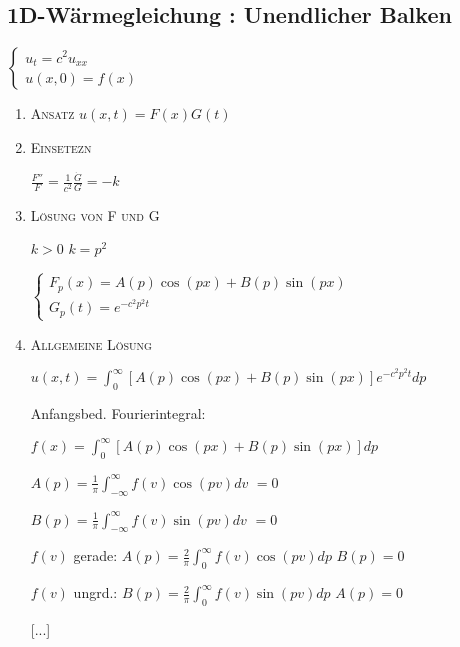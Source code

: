 \documentclass[10pt,a4paper]{scrartcl}
\begin{document}
\begin{multicols*}{3}
\begin{enumerate}
	\end{enumerate}
	
	\finn
	
	\subsection{1D-Wärmegleichung : Unendlicher Balken}
	
	\begin{center}
	$\begin{cases}
	u_t=c^2u_{xx}\\
	u(x,0)=f(x)
	\end{cases}$
	\end{center}
	
	\begin{enumerate}
	\item \scshape{Ansatz} $u(x,t) = F(x)G(t)$
	
	\item \scshape{Einsetezn}
	
	$\frac{F''}{F}=\frac{1}{c^2}\frac{\dot{G}}{G}=-k$
	
	\item \scshape{Lösung von F und G}
	
	$k>0$ \dahe $k = p^2$
	
	\begin{center}
	$\begin{cases}
	F_p(x)=A(p)\cos(px)+B(p)\sin(px)\\
	G_p(t)=e^{-c^2p^2t}
	\end{cases}$
	\end{center}
	
	\item \scshape{Allgemeine Lösung}
	
	$u(x,t)=\int_0^\infty{[A(p)\cos(px)+B(p)\sin(px)]e^{-c^2p^2t}dp}$
	
	Anfangsbed. \dahe Fourierintegral:
	
	\dahe $f(x)=\int_0^\infty{[A(p)\cos(px)+B(p)\sin(px)]dp}$
	
	$A(p)=\frac{1}{\pi}\int_{-\infty}^\infty{f(v)\cos(pv)dv}$ $=0$
	
	$B(p)=\frac{1}{\pi}\int_{-\infty}^\infty{f(v)\sin(pv)dv}$ $=0$
	
	$f(v)$ gerade: $A(p)=\frac{2}{\pi}\int_0^\infty{f(v)\cos(pv)dp}$ $B(p)=0$
	
	$f(v)$ ungrd.: $B(p)=\frac{2}{\pi}\int_0^\infty{f(v)\sin(pv)dp}$ $A(p)=0$
	
	[...]
	
	\end{enumerate}
	

\end{multicols*}
\end{document}
